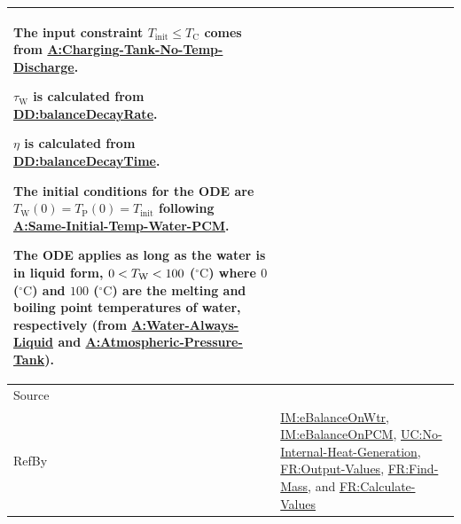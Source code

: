 \documentclass[12pt]{article}
\newcommand{\lt}{\ensuremath <}
\begin{document}
\begin{minipage}{\textwidth}
\begin{tabular}{>{\raggedright}p{}>{\raggedright\arraybackslash}p{}}
        The input constraint ${T_{\text{init}}}\leq{}{T_{\text{C}}}$ comes from \hyperref[assumpCTNOD]{A:Charging-Tank-No-Temp-Discharge}.
        
        ${τ_{\text{W}}}$ is calculated from \hyperref[DD:balanceDecayRate]{DD:balanceDecayRate}.
        
        $η$ is calculated from \hyperref[DD:balanceDecayTime]{DD:balanceDecayTime}.
        
        The initial conditions for the ODE are ${T_{\text{W}}}\left(0\right)={T_{\text{P}}}\left(0\right)={T_{\text{init}}}$ following \hyperref[assumpSITWP]{A:Same-Initial-Temp-Water-PCM}.
        
        The ODE applies as long as the water is in liquid form, $0\lt{}{T_{\text{W}}}\lt{}100$ (${{}^{\circ}\text{C}}$) where $0$ (${{}^{\circ}\text{C}}$) and $100$ (${{}^{\circ}\text{C}}$) are the melting and boiling point temperatures of water, respectively (from \hyperref[assumpWAL]{A:Water-Always-Liquid} and \hyperref[assumpAPT]{A:Atmospheric-Pressure-Tank}).
        
\\ \midrule
Source & \cite{koothoor2013}
         
\\ \midrule
RefBy & \hyperref[IM:eBalanceOnWtr]{IM:eBalanceOnWtr}, \hyperref[IM:eBalanceOnPCM]{IM:eBalanceOnPCM}, \hyperref[unlikeChgNIHG]{UC:No-Internal-Heat-Generation}, \hyperref[outputValues]{FR:Output-Values}, \hyperref[findMass]{FR:Find-Mass}, and \hyperref[calcValues]{FR:Calculate-Values}
        
\\ \bottomrule
\end{tabular}
\end{minipage}
\end{document}
